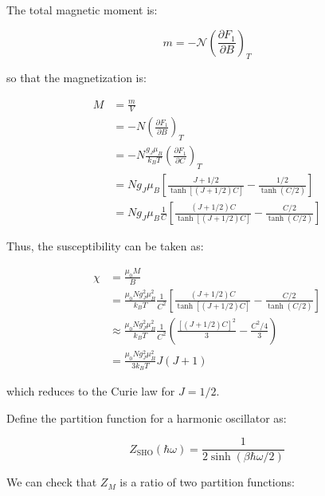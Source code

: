 \documentclass[12pt]{article}
\begin{document}
The total magnetic moment is:

\begin{equation}
    m = -\mathcal{N} \left( \frac{\partial F_{1}}{\partial B} \right)_{T}
\end{equation}

so that the magnetization is:

\begin{equation}
    \begin{split}
        M &= \frac{m}{V} \\
        &= -N \left( \frac{\partial F_{1}}{\partial B} \right)_{T} \\
        &= -N \frac{g_{J} \mu_{B}}{k_{B} T} \left( \frac{\partial F_{1}}{\partial C} \right)_{T} \\
        &= N g_{J} \mu_{B} \left[ \frac{J + 1/2}{\tanh{[(J + 1/2)C]}} - \frac{1/2}{\tanh{(C/2)}} \right] \\
        &= N g_{J} \mu_{B} \frac{1}{C} \left[ \frac{(J + 1/2)C}{\tanh{[(J + 1/2)C]}} - \frac{C/2}{\tanh{(C/2)}} \right]
    \end{split}
\end{equation}

Thus, the susceptibility can be taken as:

\begin{equation}
    \begin{split}
        \chi &= \frac{\mu_{0} M}{B} \\
        &= \frac{\mu_{0} N g_{J}^{2} \mu_{B}^{2}}{k_{B}T} \frac{1}{C^{2}} \left[ \frac{(J + 1/2)C}{\tanh{[(J + 1/2)C]}} - \frac{C/2}{\tanh{(C/2)}} \right] \\
        &\approx \frac{\mu_{0} N g_{J}^{2} \mu_{B}^{2}}{k_{B}T} \frac{1}{C^{2}} \left( \frac{[(J + 1/2)C]^{2}}{3} - \frac{C^{2}/4}{3} \right) \\
        &= \frac{\mu_{0} N g_{J}^{2} \mu_{B}^{2}}{3 k_{B}T} J(J + 1)
    \end{split}
\end{equation}

which reduces to the Curie law for $J = 1/2$.

Define the partition function for a harmonic oscillator as:

\begin{equation}
    Z_{\text{SHO}}(\hbar \omega) = \frac{1}{2 \sinh{(\beta \hbar \omega / 2)}}
\end{equation}

We can check that $Z_{M}$ is a ratio of two partition functions:
\end{document}

